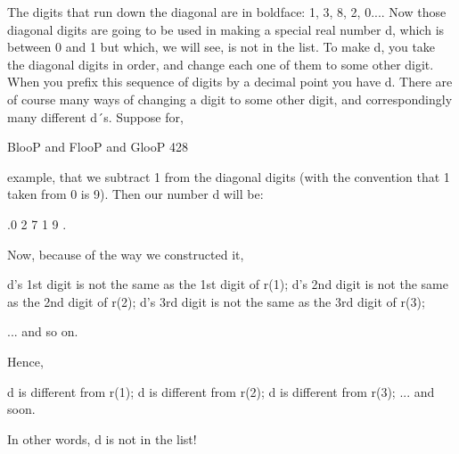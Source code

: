The digits that run down the diagonal are in boldface: 1, 3, 8, 2, 0.... Now those diagonal
digits are going to be used in making a special real number d, which is between 0 and 1
but which, we will see, is not in the list. To make d, you take the diagonal digits in order,
and change each one of them to some other digit. When you prefix this sequence of digits
by a decimal point you have d. There are of course many ways of changing a digit to
some other digit, and correspondingly many different d´s. Suppose for,




BlooP and FlooP and GlooP                                                                  428

example, that we subtract 1 from the diagonal digits (with the convention that 1 taken
from 0 is 9). Then our number d will be:

                                        .0 2 7 1 9 .

Now, because of the way we constructed it,

            d's 1st digit is not the same as the 1st digit of r(1);
            d's 2nd digit is not the same as the 2nd digit of r(2);
            d's 3rd digit is not the same as the 3rd digit of r(3);

            ... and so on.

Hence,

            d is different from r(1);
            d is different from r(2);
            d is different from r(3);
            ... and soon.

In other words, d is not in the list!

